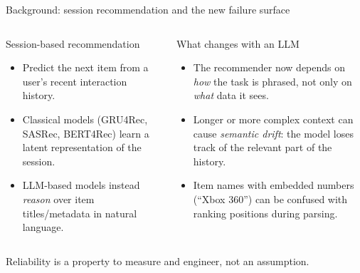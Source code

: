 \documentclass[aspectratio=169,12pt]{beamer}
\begin{document}
\begin{frame}{Background: session recommendation and the new failure surface}
\begin{columns}[T]
\begin{block}{Session-based recommendation}
\begin{itemize}
  \item Predict the next item from a user's recent interaction history.
  \item Classical models (GRU4Rec, SASRec, BERT4Rec) learn a latent
        representation of the session.
  \item LLM-based models instead \emph{reason} over item titles/metadata in
        natural language.
\end{itemize}
\end{block}

\begin{alertblock}{What changes with an LLM}
\begin{itemize}
  \item The recommender now depends on \emph{how} the task is phrased, not
        only on \emph{what} data it sees.
  \item Longer or more complex context can cause \emph{semantic drift}: the
        model loses track of the relevant part of the history.
  \item Item names with embedded numbers (``Xbox 360'') can be confused
        with ranking positions during parsing.
\end{itemize}
\end{alertblock}
\end{columns}

\vspace{0.6em}
\centering
\Large\textcolor{DeepBlue}{Reliability is a property to measure and engineer, not an assumption.}
\end{frame}
\end{document}
